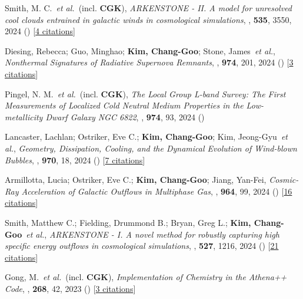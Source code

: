 \item[{16.}]Smith, M. C.~\textit{et al.}~(incl. \textbf{CGK}), \textit{ARKENSTONE - II. A model for unresolved cool clouds entrained in galactic winds in cosmological simulations}, , \textbf{535}, 3550, 2024 () [\href{http://adsabs.harvard.edu/abs/2024MNRAS.535.3550S}{4 citations}]

\item[{15.}]Diesing, Rebecca; Guo, Minghao; \textbf{Kim, Chang-Goo}; Stone, James~\textit{et al.}, \textit{Nonthermal Signatures of Radiative Supernova Remnants}, , \textbf{974}, 201, 2024 () [\href{http://adsabs.harvard.edu/abs/2024ApJ...974..201D}{3 citations}]

\item[{14.}]Pingel, N. M.~\textit{et al.}~(incl. \textbf{CGK}), \textit{The Local Group L-band Survey: The First Measurements of Localized Cold Neutral Medium Properties in the Low-metallicity Dwarf Galaxy NGC 6822}, , \textbf{974}, 93, 2024 ()

\item[{13.}]Lancaster, Lachlan; Ostriker, Eve C.; \textbf{Kim, Chang-Goo}; Kim, Jeong-Gyu~\textit{et al.}, \textit{Geometry, Dissipation, Cooling, and the Dynamical Evolution of Wind-blown Bubbles}, , \textbf{970}, 18, 2024 () [\href{http://adsabs.harvard.edu/abs/2024ApJ...970...18L}{7 citations}]

\item[{12.}]Armillotta, Lucia; Ostriker, Eve C.; \textbf{Kim, Chang-Goo}; Jiang, Yan-Fei, \textit{Cosmic-Ray Acceleration of Galactic Outflows in Multiphase Gas}, , \textbf{964}, 99, 2024 () [\href{http://adsabs.harvard.edu/abs/2024ApJ...964...99A}{16 citations}]

\item[{11.}]Smith, Matthew C.; Fielding, Drummond B.; Bryan, Greg L.; \textbf{Kim, Chang-Goo}~\textit{et al.}, \textit{ARKENSTONE - I. A novel method for robustly capturing high specific energy outflows in cosmological simulations}, , \textbf{527}, 1216, 2024 () [\href{http://adsabs.harvard.edu/abs/2024MNRAS.527.1216S}{21 citations}]

\item[{10.}]Gong, M.~\textit{et al.}~(incl. \textbf{CGK}), \textit{Implementation of Chemistry in the Athena++ Code}, , \textbf{268}, 42, 2023 () [\href{http://adsabs.harvard.edu/abs/2023ApJS..268...42G}{3 citations}]


